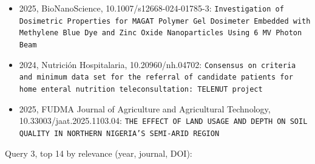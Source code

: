 \begin{itemize}
\item 2025, BioNanoScience, 10.1007/s12668-024-01785-3: \texttt{Investigation of Dosimetric Properties for MAGAT Polymer Gel Dosimeter Embedded with Methylene Blue Dye and Zinc Oxide Nanoparticles Using 6 MV Photon Beam}
\item 2024, Nutrici\'on Hospitalaria, 10.20960/nh.04702: \texttt{Consensus on criteria and minimum data set for the referral of candidate patients for home enteral nutrition teleconsultation: TELENUT project}
\item 2025, FUDMA Journal of Agriculture and Agricultural Technology, 10.33003/jaat.2025.1103.04: \texttt{THE EFFECT OF LAND USAGE AND DEPTH ON SOIL QUALITY IN NORTHERN NIGERIA'S SEMI-ARID REGION}
\end{itemize}

Query 3, top 14 by relevance (year, journal, DOI):

